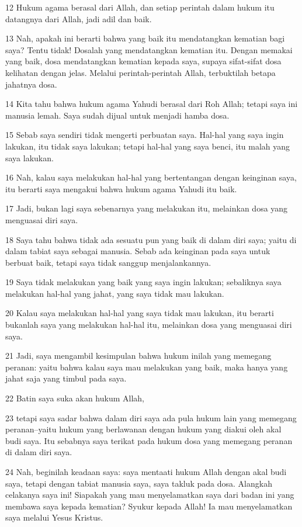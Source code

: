 \par 12 Hukum agama berasal dari Allah, dan setiap perintah dalam hukum itu datangnya dari Allah, jadi adil dan baik.
\par 13 Nah, apakah ini berarti bahwa yang baik itu mendatangkan kematian bagi saya? Tentu tidak! Dosalah yang mendatangkan kematian itu. Dengan memakai yang baik, dosa mendatangkan kematian kepada saya, supaya sifat-sifat dosa kelihatan dengan jelas. Melalui perintah-perintah Allah, terbuktilah betapa jahatnya dosa.
\par 14 Kita tahu bahwa hukum agama Yahudi berasal dari Roh Allah; tetapi saya ini manusia lemah. Saya sudah dijual untuk menjadi hamba dosa.
\par 15 Sebab saya sendiri tidak mengerti perbuatan saya. Hal-hal yang saya ingin lakukan, itu tidak saya lakukan; tetapi hal-hal yang saya benci, itu malah yang saya lakukan.
\par 16 Nah, kalau saya melakukan hal-hal yang bertentangan dengan keinginan saya, itu berarti saya mengakui bahwa hukum agama Yahudi itu baik.
\par 17 Jadi, bukan lagi saya sebenarnya yang melakukan itu, melainkan dosa yang menguasai diri saya.
\par 18 Saya tahu bahwa tidak ada sesuatu pun yang baik di dalam diri saya; yaitu di dalam tabiat saya sebagai manusia. Sebab ada keinginan pada saya untuk berbuat baik, tetapi saya tidak sanggup menjalankannya.
\par 19 Saya tidak melakukan yang baik yang saya ingin lakukan; sebaliknya saya melakukan hal-hal yang jahat, yang saya tidak mau lakukan.
\par 20 Kalau saya melakukan hal-hal yang saya tidak mau lakukan, itu berarti bukanlah saya yang melakukan hal-hal itu, melainkan dosa yang menguasai diri saya.
\par 21 Jadi, saya mengambil kesimpulan bahwa hukum inilah yang memegang peranan: yaitu bahwa kalau saya mau melakukan yang baik, maka hanya yang jahat saja yang timbul pada saya.
\par 22 Batin saya suka akan hukum Allah,
\par 23 tetapi saya sadar bahwa dalam diri saya ada pula hukum lain yang memegang peranan--yaitu hukum yang berlawanan dengan hukum yang diakui oleh akal budi saya. Itu sebabnya saya terikat pada hukum dosa yang memegang peranan di dalam diri saya.
\par 24 Nah, beginilah keadaan saya: saya mentaati hukum Allah dengan akal budi saya, tetapi dengan tabiat manusia saya, saya takluk pada dosa. Alangkah celakanya saya ini! Siapakah yang mau menyelamatkan saya dari badan ini yang membawa saya kepada kematian? Syukur kepada Allah! Ia mau menyelamatkan saya melalui Yesus Kristus.

